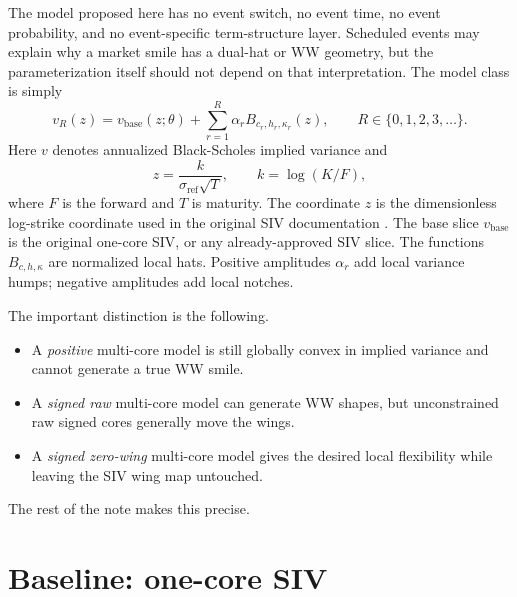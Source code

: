 \documentclass[11pt]{article}
\newcommand{\sigref}{\sigma_{\mathrm{ref}}}
\begin{document}
The model proposed here has no event switch, no event time, no event probability, and no event-specific term-structure layer.  Scheduled events may explain why a market smile has a dual-hat or WW geometry, but the parameterization itself should not depend on that interpretation.  The model class is simply
\begin{equation}
  \boxed{
  v_{R}(z)
  = v_{\mathrm{base}}(z;\theta)
    + \sum_{r=1}^{R}\alpha_r B_{c_r,h_r,\kappa_r}(z),
  \qquad R\in\{0,1,2,3,\ldots\}.
  }
  \label{eq:main-model}
\end{equation}
Here $v$ denotes annualized Black-Scholes implied variance and
\begin{equation}
  z=\frac{k}{\sigref\sqrt{T}},\qquad k=\log(K/F),
  \label{eq:z-def}
\end{equation}
where $F$ is the forward and $T$ is maturity.  The coordinate $z$ is the dimensionless log-strike coordinate used in the original SIV documentation \cite{sivdoc}.  The base slice $v_{\mathrm{base}}$ is the original one-core SIV, or any already-approved SIV slice.  The functions $B_{c,h,\kappa}$ are normalized local hats.  Positive amplitudes $\alpha_r$ add local variance humps; negative amplitudes add local notches.

The important distinction is the following.
\begin{itemize}[leftmargin=2em]
  \item A \emph{positive} multi-core model is still globally convex in implied variance and cannot generate a true WW smile.
  \item A \emph{signed raw} multi-core model can generate WW shapes, but unconstrained raw signed cores generally move the wings.
  \item A \emph{signed zero-wing} multi-core model gives the desired local flexibility while leaving the SIV wing map untouched.
\end{itemize}
The rest of the note makes this precise.

\section{Baseline: one-core SIV}
\end{document}
